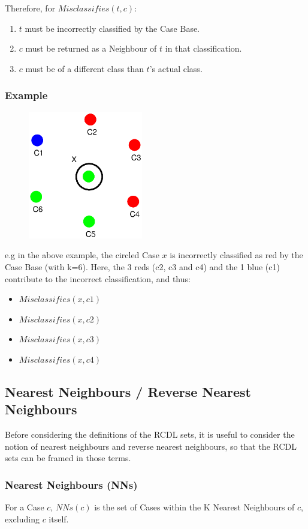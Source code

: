 \documentclass[a4paper,11pt]{report}
\begin{document}
Therefore, for $ Misclassifies(t, c) $:
\begin{enumerate}
	\item $t$ must be incorrectly classified by the Case Base.
	\item $c$ must be returned as a Neighbour of $t$ in that classification.
	\item $c$ must be of a different class than $t$'s actual class.
\end{enumerate}

\subsubsection{Example}
\begin{figure}[h!]
\includegraphics[width=5cm]{./Drawn/EqualDistanceMisclassifiesEg}
\end{figure}

e.g  in the above example, the circled Case $x$ is incorrectly classified as red by the Case Base (with k=6). Here, the 3 reds (c2, c3 and c4) and the 1 blue (c1) contribute to the incorrect classification, and thus:
\begin{itemize}
	\item $ Misclassifies(x, c1) $
	\item $ Misclassifies(x, c2) $
	\item $ Misclassifies(x, c3) $
	\item $ Misclassifies(x, c4) $
\end{itemize}

\subsection{Nearest Neighbours / Reverse Nearest Neighbours}
Before considering the definitions of the RCDL sets, it is useful to consider the notion of nearest neighbours and reverse nearest neighbours, so that the RCDL sets can be framed in those terms.

\subsubsection{Nearest Neighbours (NNs)}
For a Case $c$, $ NNs(c) $ is the set of Cases within the K Nearest Neighbours of $c$, excluding $c$ itself.
\end{document}
